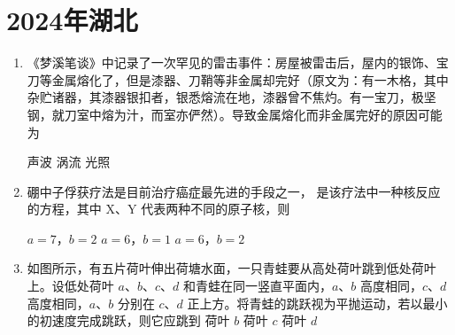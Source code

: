 \documentclass[\gkver]{gaokaozhenti}
\begin{document}
\chapter{2024年湖北}

\begin{enumerate}
\item
《梦溪笔谈》中记录了一次罕见的雷击事件：房屋被雷击后，屋内的银饰、宝刀等金属熔化了，但是漆器、刀鞘等非金属却完好（原文为：有一木格，其中杂贮诸器，其漆器银扣者，银悉熔流在地，漆器曾不焦灼。有一宝刀，极坚钢，就刀室中熔为汁，而室亦俨然）。导致金属熔化而非金属完好的原因可能为  

{声波}
{涡流}
{光照}


\item
硼中子俘获疗法是目前治疗癌症最先进的手段之一， 是该疗法中一种核反应的方程，其中 $ \mathrm{X} $、$ \mathrm{Y} $ 代表两种不同的原子核，则 


{$ a =7 $，$ b =2 $}
{$ a =6 $，$ b =1 $}
{$ a =6 $，$ b =2 $}


\item
如图所示，有五片荷叶伸出荷塘水面，一只青蛙要从高处荷叶跳到低处荷叶上。设低处荷叶 $ a $、$ b $、$ c $、$ d $ 和青蛙在同一竖直平面内，$ a $、$ b $ 高度相同，$ c $、$ d $ 高度相同，$ a $、$ b $ 分别在 $ c $、$ d $ 正上方。将青蛙的跳跃视为平抛运动，若以最小的初速度完成跳跃，则它应跳到 
{荷叶 $ b $}
{荷叶 $ c $}
{荷叶 $ d $}


\end{enumerate}
\end{document}
